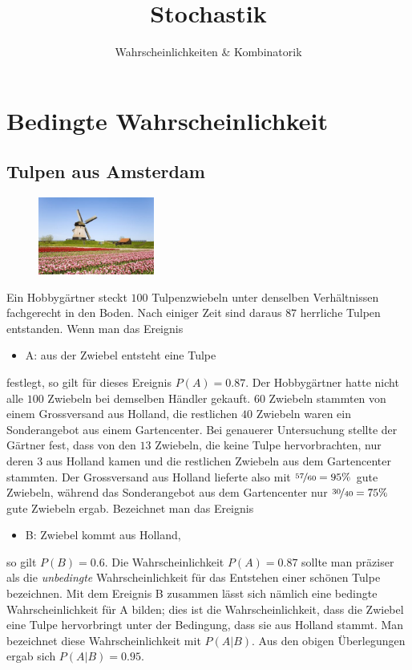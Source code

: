 \documentclass[%
11pt,%
twoside,%
titlepage,%
german,%
headsepline%
]{scrartcl}
\title{Stochastik}
\subtitle{Wahrscheinlichkeiten \& Kombinatorik}
\author{}
\date{}
\begin{document}
\maketitle
\thispagestyle{empty}
\cleardoublepage
\tableofcontents
\cleardoublepage

\pagestyle{headings}

\clearpage

\section{Bedingte Wahrscheinlichkeit}
\subsection{Tulpen aus Amsterdam}

\begin{figure}
  \begin{center}
    \includegraphics[width=0.34\textwidth]{pictures/tulpen}
  \end{center}
\end{figure}
Ein Hobbygärtner steckt $100$ Tulpenzwiebeln unter denselben Verhältnissen fachgerecht in den Boden. Nach einiger Zeit sind daraus $87$ herrliche Tulpen entstanden. Wenn man das Ereignis
\begin{itemize}
    \item[] A: aus der Zwiebel entsteht eine Tulpe
\end{itemize}
festlegt, so gilt für dieses Ereignis $P(A)=0.87$.
Der Hobbygärtner hatte nicht alle $100$ Zwiebeln bei demselben Händler gekauft. $60$ Zwiebeln stammten von einem Grossversand aus Holland, die restlichen $40$ Zwiebeln waren ein Sonderangebot aus einem Gartencenter. Bei genauerer Untersuchung stellte der Gärtner fest, dass von den $13$ Zwiebeln, die keine Tulpe hervorbrachten, nur deren $3$ aus Holland kamen und die restlichen Zwiebeln aus dem Gartencenter stammten. Der Grossversand aus Holland lieferte also mit $\nicefrac{57}{60}=95\%$ gute Zwiebeln, während das Sonderangebot aus dem Gartencenter nur $\nicefrac{30}{40}=75\%$ gute Zwiebeln ergab. Bezeichnet man das Ereignis
\begin{itemize}
    \item[] B: Zwiebel kommt aus Holland,
\end{itemize}
so gilt $P(B)=0.6$.
Die Wahrscheinlichkeit $P(A)=0.87$ sollte man präziser als die \emph{unbedingte} Wahrscheinlichkeit für das Entstehen einer schönen Tulpe bezeichnen. Mit dem Ereignis B zusammen lässt sich nämlich eine bedingte Wahrscheinlichkeit für A bilden; dies ist die Wahrscheinlichkeit, dass die Zwiebel eine Tulpe hervorbringt unter der Bedingung, dass sie aus Holland stammt. Man bezeichnet diese Wahrscheinlichkeit mit $P(A|B)$.
Aus den obigen Überlegungen ergab sich $P(A|B)=0.95$.
\end{document}
